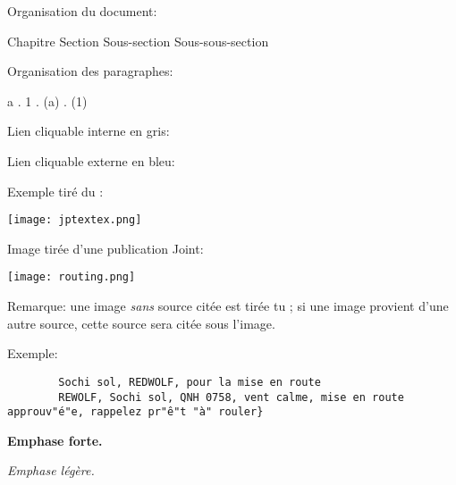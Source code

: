 
%

\begin{e1}
	\item Organisation du document:

	{\Large Chapitre} {\large Section} Sous-section {\small Sous-sous-section}

	\item Organisation des paragraphes:

	{\Large a} . {\large 1} . (a) . {\small (1)}
	
	\item Lien cliquable interne en \textcolor{\intlink}{gris}:
	
	
	\item Lien cliquable externe en \textcolor{\extlink}{bleu}:
	
	\thirdwing

	\item Exemple tiré du \jp{}:

	\texttt{[image: jptextex.png]}

	\item Image tirée d'une publication Joint:

	\texttt{[image: routing.png]}
	
	Remarque: une image \emph{sans} source citée est tirée tu \jp{}; si une image provient d'une autre source, cette source sera citée sous l'image.

	\item Exemple:
	\begin{lstlisting}
		Sochi sol, REDWOLF, pour la mise en route
		REWOLF, Sochi sol, QNH 0758, vent calme, mise en route approuv"é"e, rappelez pr"ê"t "à" rouler}
	\end{lstlisting}

	\item \textbf{Emphase forte.}

	\item \emph{Emphase légère.}

	\item {}
	
	
	\item {}

	\item {}

\end{e1} 
